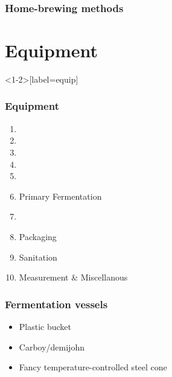 \documentclass{beamer}
\begin{document}

\begin{frame}
  \frametitle{Home-brewing methods}
  \begin{enumerate}
  \end{enumerate}
\end{frame}


\section{Equipment}

\begin{frame}<1-2>[label=equip]
  \frametitle{Equipment}
  \begin{enumerate}
  \item{}
  \item{}
  \item{}
  \item{}
  \item{}
  \item\alert<2>{Primary Fermentation}
  \item{}
  \item\alert<3>{Packaging}\\\bigskip
  \item\alert<4>{Sanitation}
  \item\alert<5>{Measurement \& Miscellanous}
  \end{enumerate}
\end{frame}

\begin{frame}
  \frametitle{Fermentation vessels}
  \begin{itemize}
  \item Plastic bucket
  \item Carboy/demijohn
  \item Fancy temperature-controlled steel cone
  \end{itemize}
\end{frame}
\end{document}
